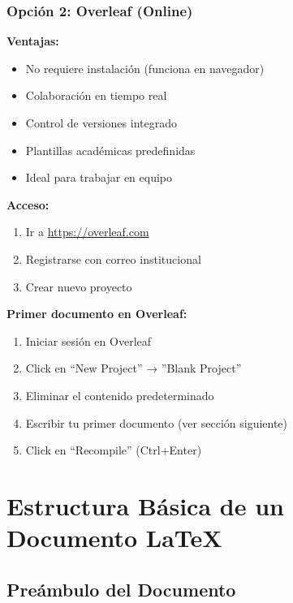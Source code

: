 \documentclass[11pt,letterpaper]{article}
\begin{document}
	\subsubsection{Opción 2: Overleaf (Online)}
	
	\textbf{Ventajas:}
	\begin{itemize}
		\item No requiere instalación (funciona en navegador)
		\item Colaboración en tiempo real
		\item Control de versiones integrado
		\item Plantillas académicas predefinidas
		\item Ideal para trabajar en equipo
	\end{itemize}
	
	\textbf{Acceso:}
	\begin{enumerate}
		\item Ir a \url{https://overleaf.com}
		\item Registrarse con correo institucional
		\item Crear nuevo proyecto
	\end{enumerate}
	
	\begin{cajaejemplo}
		\textbf{Primer documento en Overleaf:}
		\begin{enumerate}
			\item Iniciar sesión en Overleaf
			\item Click en ``New Project'' → ''Blank Project''
			\item Eliminar el contenido predeterminado
			\item Escribir tu primer documento (ver sección siguiente)
			\item Click en ``Recompile'' (Ctrl+Enter)
		\end{enumerate}
	\end{cajaejemplo}
	
	\newpage
	
	
	\section{Estructura Básica de un Documento \LaTeX}
	
	\subsection{Preámbulo del Documento}
	
\end{document}
